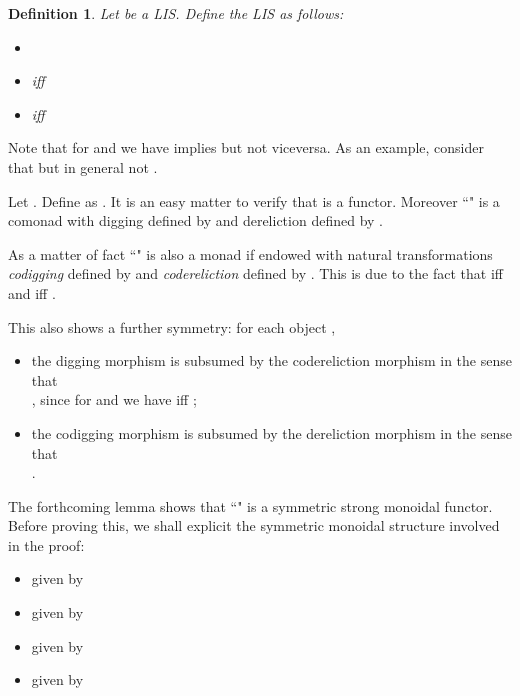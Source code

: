 \documentclass[copyright,creativecommons]{eptcs}
\newtheorem{definition}[theorem]{Definition}
\begin{document}
\begin{definition}
Let  be a LIS. Define the LIS  as follows:
\begin{itemize}
\item 
\item  iff 
\item  iff 
\end{itemize}
\end{definition} 

Note that for  and  we have  implies  but not viceversa. As an example, consider that  but in general not .

Let . Define  as \mbox{.} It is an easy matter to verify that \mbox{} is a functor. Moreover ``" is a comonad with digging \mbox{} defined by \mbox{} and dereliction \mbox{} defined by \mbox{.}

\medskip

As a matter of fact ``" is also a monad if endowed with natural transformations \emph{codigging} \mbox{} defined by \mbox{} and \emph{codereliction} \mbox{} defined by \mbox{.} This is due to the fact that \mbox{} iff \mbox{} and \mbox{} iff \mbox{}.

\medskip

This also shows a further symmetry: for each object , 
\begin{itemize}
\item the digging morphism is subsumed by the codereliction morphism in the sense that\\ \mbox{}, since for  and  we have \mbox{} iff \mbox{};
\item the codigging morphism is subsumed by the dereliction morphism in the sense that\\ \mbox{}.
\end{itemize}

\medskip

The forthcoming lemma shows that ``" is a symmetric strong monoidal functor. Before proving this, we shall explicit the symmetric monoidal structure  involved in the proof:
\begin{itemize}
\item  given by 


\item  given by 


\item  given by 

\item  given by 
\end{itemize}

\bigskip
\end{document}
